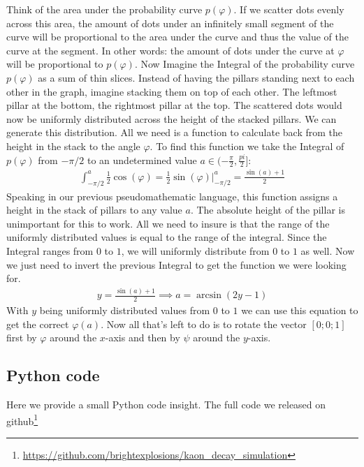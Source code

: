 \documentclass[12pt,a4paper,oneside,english]{article}
\begin{document}
Think of the area under the probability curve $p(\varphi)$. If we scatter dots evenly across this area, the amount of dots under an infinitely small segment of the curve will be proportional to the area under the curve and thus the value of the curve at the segment. In other words: the amount of dots under the curve at $\varphi$ will be proportional to $p(\varphi)$. Now Imagine the Integral of the probability curve $p(\varphi)$ as a sum of thin slices. Instead of having the pillars standing next to each other in the graph, imagine stacking them on top of each other. The leftmost pillar at the bottom, the rightmost pillar at the top. The scattered dots would now be uniformly distributed across the height of the stacked pillars. We can generate this distribution. All we need is a function to calculate back from the height in the stack to the angle $\varphi$.
To find this function we take the Integral of $p(\varphi)$ from $-\pi/2$ to an undetermined value $a \in (-\frac{\pi}{2}, \frac{pi}{2}]$:
\begin{align}
\int_{-\pi/2}^{a}\frac{1}{2}\cos(\varphi) = \frac{1}{2} \sin(\varphi) \bigg|_{-\pi/2}^{a} = \frac{\sin(a)+1}{2}
\end{align}
Speaking in our previous pseudomathematic language, this function assigns a height in the stack of pillars to any value $a$. The absolute height of the pillar is unimportant for this to work. All we need to insure is that the range of the uniformly distributed values is equal to the range of the integral. Since the Integral ranges from $0$ to $1$, we will uniformly distribute from $0$ to $1$ as well. Now we just need to invert the previous Integral to get the function we were looking for.
\begin{align}
y = \frac{\sin(a)+1}{2} \implies a=\arcsin(2y-1)
\end{align}
With $y$ being uniformly distributed values from $0$ to $1$ we can use this equation to get the correct $\varphi(a)$. Now all that’s left to do is to rotate the vector $[0;0;1]$ first by $\varphi$ around the $x$-axis and then by $\psi$ around the $y$-axis.
\subsection{Python code}
Here we provide a small Python code insight. The full code we released on github\footnote{\href{https://github.com/brightexplosions/kaon_decay_simulation}{https://github.com/brightexplosions/kaon\_decay\_simulation}}
	\footnotesize
\end{document}
